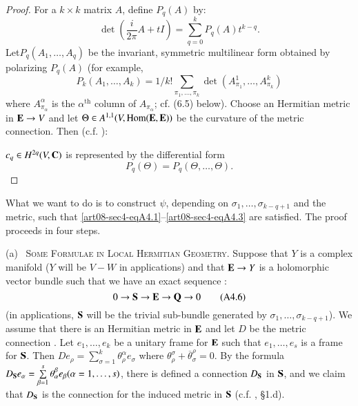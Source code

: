 \begin{proof}
For a $k\times k$ matrix $A$, define $P_{q}(A)$ by:
\begin{equation*}
\det\left(\frac{i}{2\pi}A+tI\right)=\sum\limits^{k}_{q=0}P_{q}(A)t^{k-q}.\tag{A4.4}\label{art08-sec4-eqA4.4}
\end{equation*}
Let\pageoriginale $P_{q}(A_{1},\ldots,A_{q})$ be the invariant, symmetric multilinear form obtained by polarizing $P_{q}(A)$ (for example, 
$$
P_{k}(A_{1},\ldots,A_{k})=1/k!\sum\limits_{\pi_{1},\ldots,\pi_{k}}\det(A^{1}_{\pi_{1}},\ldots,A^{k}_{\pi_{k}})
$$ 
where $A^{\alpha}_{\pi_{\alpha}}$ is the $\alpha^{\text{th}}$ column of $A_{\pi_{\alpha}}$; cf. (6.5) below). Choose an Hermitian metric in $\mathbf{E}\to V$ and let $\Theta\in A^{1,1}(V,\operatorname{\mathrm{Hom}} (\mathbf{E},\mathbf{E}))$ be the curvature of the metric connection. Then (c.f. \cite{art08-key11}):

$c_{q}\in H^{2q}(V,\mathbf{C})$ is represented by the differential form
\begin{equation*}
P_{q}(\Theta)=P_{q}(\Theta,\ldots,\Theta).\tag{A4.5}\label{art08-sec4-eqA4.5}
\end{equation*}
\end{proof}

What we want to do is to construct $\psi$, depending on $\sigma_{1},\ldots,\sigma_{k-q+1}$ and the metric, such that \eqref{art08-sec4-eqA4.1}--\eqref{art08-sec4-eqA4.3} are satisfied. The proof proceeds in four steps.


(a)~ \textsc{Some Formulae in Local Hermitian Geometry.} Suppose that $Y$ is a complex manifold ($Y$ will be $V-W$ in applications) and that $\mathbf{E}\to Y$ is a holomorphic vector bundle such that we have an exact sequence :
\begin{equation*}
0\to \mathbf{S}\to \mathbf{E}\to \mathbf{Q}\to 0\tag{A4.6}\label{art08-sec4-eqA4.6}
\end{equation*}
(in applications, $\mathbf{S}$ will be the trivial sub-bundle generated by $\sigma_{1},\ldots,\sigma_{k-q+1}$). We assume that there is an Hermitian metric in $\mathbf{E}$ and let $D$ be the metric connection \cite{art08-key11}. Let $e_{1},\ldots,e_{k}$ be a unitary frame for $\mathbf{E}$ such that $e_{1},\ldots,e_{s}$ is a frame for $\mathbf{S}$. Then $De_{\rho}=\sum\limits^{k}_{\sigma=1}\theta^{\alpha}_{\rho}e_{\sigma}$ where $\theta^{\sigma}_{\rho}+\overline{\theta}^{\rho}_{\sigma}=0$. By the formula $D_{\mathbf{S}}e_{\alpha}=\sum\limits^{s}_{\beta=1}\theta^{\beta}_{\alpha}e_{\beta}(\alpha=1,\ldots,s)$, there is defined a connection $D_{\mathbf{S}}$ in $\mathbf{S}$, and we claim that $D_{\mathbf{S}}$ is the connection for the induced metric in $\mathbf{S}$ (c.f. \cite{art08-key11}, \S1.d).


